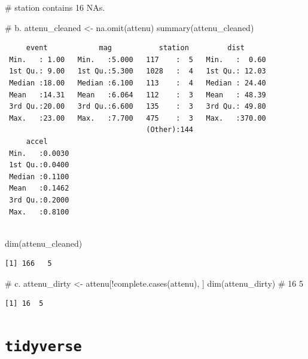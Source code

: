\documentclass[
  letterpaper,
  DIV=11,
  numbers=noendperiod]{scrreprt}
\newenvironment{Shaded}{\begin{snugshade}}{\end{snugshade}}
\newcommand{\CommentTok}[1]{\textcolor[rgb]{0.37,0.37,0.37}{#1}}
\newcommand{\FunctionTok}[1]{\textcolor[rgb]{0.28,0.35,0.67}{#1}}
\newcommand{\NormalTok}[1]{\textcolor[rgb]{0.00,0.23,0.31}{#1}}
\newcommand{\OtherTok}[1]{\textcolor[rgb]{0.00,0.23,0.31}{#1}}
\newcommand{\SpecialCharTok}[1]{\textcolor[rgb]{0.37,0.37,0.37}{#1}}
\begin{document}
\begin{Shaded}
\begin{Highlighting}[]
\CommentTok{\# station contains 16 NAs.}

\CommentTok{\# b.}
\NormalTok{attenu\_cleaned }\OtherTok{\textless{}{-}} \FunctionTok{na.omit}\NormalTok{(attenu)}
\FunctionTok{summary}\NormalTok{(attenu\_cleaned)}
\end{Highlighting}
\end{Shaded}

\begin{verbatim}
     event            mag           station         dist       
 Min.   : 1.00   Min.   :5.000   117    :  5   Min.   :  0.60  
 1st Qu.: 9.00   1st Qu.:5.300   1028   :  4   1st Qu.: 12.03  
 Median :18.00   Median :6.100   113    :  4   Median : 24.40  
 Mean   :14.31   Mean   :6.064   112    :  3   Mean   : 48.39  
 3rd Qu.:20.00   3rd Qu.:6.600   135    :  3   3rd Qu.: 49.80  
 Max.   :23.00   Max.   :7.700   475    :  3   Max.   :370.00  
                                 (Other):144                   
     accel       
 Min.   :0.0030  
 1st Qu.:0.0400  
 Median :0.1100  
 Mean   :0.1462  
 3rd Qu.:0.2000  
 Max.   :0.8100  
                 
\end{verbatim}

\begin{Shaded}
\begin{Highlighting}[]
\FunctionTok{dim}\NormalTok{(attenu\_cleaned)}
\end{Highlighting}
\end{Shaded}

\begin{verbatim}
[1] 166   5
\end{verbatim}

\begin{Shaded}
\begin{Highlighting}[]
\CommentTok{\# c.}
\NormalTok{attenu\_dirty }\OtherTok{\textless{}{-}}\NormalTok{ attenu[}\SpecialCharTok{!}\FunctionTok{complete.cases}\NormalTok{(attenu), ]}
\FunctionTok{dim}\NormalTok{(attenu\_dirty) }\CommentTok{\# 16 5}
\end{Highlighting}
\end{Shaded}

\begin{verbatim}
[1] 16  5
\end{verbatim}

\section{\texorpdfstring{\texttt{tidyverse}}{tidyverse}}\label{tidyverse}
\end{document}
